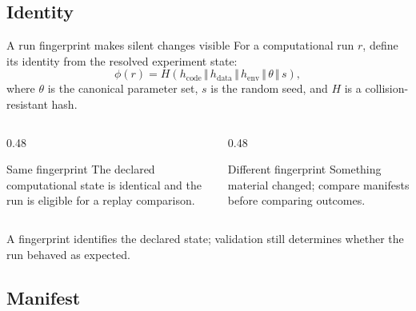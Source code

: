 \subsection{Identity}

\begin{frame}{A run fingerprint makes silent changes visible}
  For a computational run $r$, define its identity from the resolved experiment
  state:
  \begin{equation*}
    \phi(r)
      = H\!\left(
          h_{\mathrm{code}}\,\Vert\,
          h_{\mathrm{data}}\,\Vert\,
          h_{\mathrm{env}}\,\Vert\,
          \theta\,\Vert\,s
        \right),
  \end{equation*}
  where $\theta$ is the canonical parameter set, $s$ is the random seed, and
  $H$ is a collision-resistant hash.

  \begin{columns}[T,onlytextwidth]
    \begin{column}{0.48\textwidth}
      \begin{block}{Same fingerprint}
        The declared computational state is identical and the run is eligible for
        a replay comparison.
      \end{block}
    \end{column}
    \begin{column}{0.48\textwidth}
      \begin{alertblock}{Different fingerprint}
        Something material changed; compare manifests before comparing outcomes.
      \end{alertblock}
    \end{column}
  \end{columns}

  \vfill
  \small\color{SzegedInk!82}
  A fingerprint identifies the declared state; validation still determines whether
  the run behaved as expected.
\end{frame}

\subsection{Manifest}

